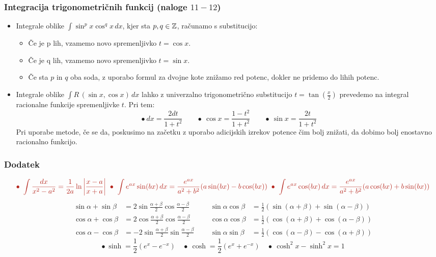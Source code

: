 \newpage
{\color{Purple} \subsubsection*{Integracija trigonometričnih funkcij (naloge $11-12$)}}
\begin{itemize}
    \item Integrale oblike $\displaystyle \int \sin^px \cos^q x \, dx$, kjer sta $p,q \in \mathbb{Z}$, računamo s substitucijo:
    \begin{itemize}
        \item Če je p lih, vzamemo novo spremenljivko $t = \cos x$.
        \item Če je q lih, vzamemo novo spremenljivko $t = \sin x$.
        \item Če sta $p$ in $q$ oba soda, z uporabo formul za dvojne kote znižamo red potenc, dokler ne pridemo do lihih potenc.
    \end{itemize}

    \item Integrale oblike $\displaystyle \int R \, (\sin x, \cos x) \, dx$ lahko z univerzalno trigonometrično substitucijo $\displaystyle t = \tan \left(\frac{x}{2}\right)$ prevedemo na integral racionalne funkcije spremenljivke $t$. Pri tem:
    $$\bullet \ dx = \frac{2dt}{1+t^2} \qquad \bullet \ \cos x = \frac{1-t^2}{1+t^2} \qquad \bullet \ \sin x = \frac{2t}{1+t^2}$$
    Pri uporabe metode, če se da, poskusimo na začetku z uporabo adicijskih izrekov potence čim bolj znižati, da dobimo bolj enostavno racionalno funkcijo.
\end{itemize}

{\color{Purple} \subsubsection*{Dodatek}}
$$
\color{BrickRed}
\bullet \ \int \frac{dx}{x^2-a^2} = \frac{1}{2a} \ln \left| \frac{x-a}{x+a} \right| \
\bullet \ \int e^{ax} \sin (bx) \, dx = \frac{e^{ax}}{a^2+b^2}(a  \sin (bx) - b \cos (bx)) \
\bullet \ \int e^{ax} \cos (bx) \, dx = \frac{e^{ax}}{a^2+b^2}(a  \cos (bx) + b \sin (bx)) 
$$
%
\begin{align*}
    \sin \alpha + \sin \beta &= 2 \sin \frac{\alpha + \beta}{2} \cos \frac{\alpha - \beta}{2} \qquad
    &\sin \alpha \cos \beta &= \frac{1}{2} (\sin (\alpha + \beta) + \sin (\alpha - \beta)) \\ 
    \cos \alpha + \cos \beta &= 2 \cos \frac{\alpha + \beta}{2} \cos \frac{\alpha - \beta}{2} \qquad
    &\cos \alpha \cos \beta &= \frac{1}{2} (\cos (\alpha + \beta) + \cos (\alpha - \beta))
    \\
    \cos \alpha - \cos \beta &= -2 \sin \frac{\alpha + \beta}{2} \sin \frac{\alpha - \beta}{2}
    &\sin \alpha \sin \beta &= \frac{1}{2} (\cos (\alpha - \beta) - \cos (\alpha + \beta))
\end{align*}
%
\begin{equation*}
    \bullet \ \sinh = \frac{1}{2} (e^x - e^{-x}) \quad \bullet \ \cosh = \frac{1}{2} (e^x + e^{-x}) \quad \bullet \ \cosh^2 x - \sinh^2 x = 1
\end{equation*}